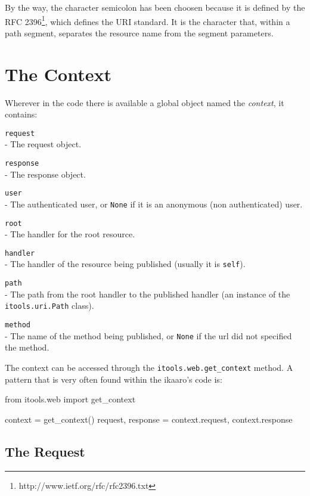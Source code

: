 By the way, the character semicolon has been choosen because it is defined
by the RFC 2396\footnote{http://www.ietf.org/rfc/rfc2396.txt}, which defines
the URI standard. It is the character that, within a path segment, separates
the resource name from the segment parameters.



\section{The Context}

Wherever in the code there is available a global object named the
{\em context}, it contains:

\begin{api}
  {\tt request}\\
  - The request object.

  {\tt response}\\
  - The response object.

  {\tt user}\\
  - The authenticated user, or {\tt None} if it is an anonymous (non
    authenticated) user.

  {\tt root}\\
  - The handler for the root resource.

  {\tt handler}\\
  - The handler of the resource being published (usually it is {\tt self}).

  {\tt path}\\
  - The path from the root handler to the published handler (an instance
    of the {\tt itools.uri.Path} class).

  {\tt method}\\
  - The name of the method being published, or {\tt None} if the url did
    not specified the method.
\end{api}

The context can be accessed through the {\tt itools.web.get\_context}
method. A pattern that is very often found within the ikaaro's code is:

\begin{code}
    from itools.web import get_context

    context = get_context()
    request, response = context.request, context.response
\end{code}


\subsection{The Request}

